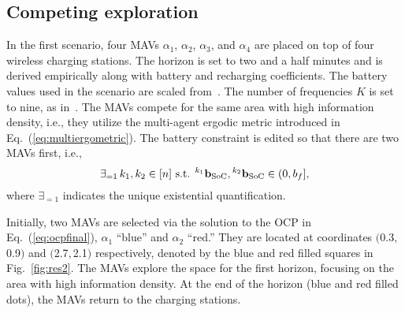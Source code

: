 \documentclass[letterpaper,10pt,conference,twoside]{IEEEtran}
\theoremstyle{definition}
\begin{document}
\subsection*{Competing exploration}
\noindent
In the first scenario, four MAVs $\alpha_1$, $\alpha_2$, $\alpha_3$, and $\alpha_4$ are placed on top of four wireless charging stations. %
The horizon is set to two and a half minutes and is derived empirically along with battery and recharging coefficients. The battery values used in the scenario are scaled from~\cite{zhao2017observability}. The number of frequencies $K$ is set to nine, as in~\cite{calinon2020mixture}. %
The MAVs compete for the same area with high information density, i.e., they utilize the multi-agent ergodic metric introduced in Eq.~(\ref{eq:multiergometric}). 
%
The battery constraint is edited so that there are two MAVs first, i.e.,\vspace*{-.165cm}
\begin{equation}
\exists_{=1}\, k_1,k_2\in[n]\text{ s.t. }{}^{k_1} \mathbf{b}_{\text{SoC}},{}^{k_2} \mathbf{b}_{\text{SoC}}\in(0,b_f],\vspace*{-.1cm}
\end{equation} 
where %
$\exists_{=1}$ indicates the unique existential quantification.

Initially, two MAVs are selected via the solution to the OCP in Eq.~(\ref{eq:ocpfinal}), $\alpha_1$ ``blue'' and $\alpha_2$ ``red.'' They are located at coordinates $($0.3$,$0.9$)$ and $($2.7$,$2.1$)$ respectively, denoted by the blue and red filled squares in Fig.~\ref{fig:res2}. The MAVs explore the space for the first horizon, focusing on the area with high information density. At the end of the horizon (blue and red filled dots), the MAVs return to the charging stations. %
\end{document}
